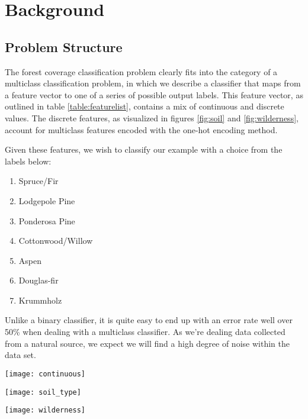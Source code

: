 \section{Background}
\label{sec:-back}
\subsection{Problem Structure}
The forest coverage classification problem clearly fits into the 
category of a multiclass classification problem, in which we describe 
a classifier that maps from a feature vector to one of a series of 
possible output labels.  This feature vector, as outlined in table 
\ref{table:featurelist}, contains a mix of continuous and discrete 
values.  The discrete features, as visualized in figures \ref{fig:soil} 
and \ref{fig:wilderness}, account for multiclass features encoded with 
the one-hot encoding method.  

Given these features, we wish to classify our example with a choice 
from the labels 
below:
\begin{enumerate}
\item Spruce/Fir
\item Lodgepole Pine
\item Ponderosa Pine
\item Cottonwood/Willow
\item Aspen
\item Douglas-fir
\item Krummholz
\end{enumerate}

Unlike a binary classifier, it is quite easy to end up with an 
error rate well over 50\% when dealing with a multiclass 
classifier.  As we're dealing data collected from a natural source, we 
expect we will find a high degree of noise within the data set.


\begin{figure*}
\centering
\texttt{[image: continuous]}
 \caption{Continuous variables}
 \label{fig:continuous_features}
\end{figure*}

\begin{figure*}
\centering
\texttt{[image: soil\_type]}
 \caption{Soil types and accompanying cover types}
 \label{fig:soil}
\end{figure*}

\begin{figure*}
\centering
\texttt{[image: wilderness]}
 \caption{Wilderness types and accompanying cover types}
 \label{fig:wilderness}
\end{figure*}


